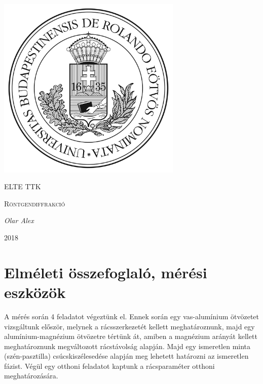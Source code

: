 \documentclass[a4paper,12pt]{article}
\begin{document}
\linespread{1.25}

\begin{titlepage}

	\centering
	\includegraphics[width=0.66\textwidth]{elte.jpg}\par\vspace{1cm}
	{\scshape\LARGE ELTE TTK \par}
	\vspace{3cm}
	{\scshape\Large Röntgendiffrakció \par}
	\vspace{1cm}
	{\large\itshape Olar Alex\par}
	\vspace{3cm}
	{\large 2018 \par}
	
\end{titlepage}

\tableofcontents

\newpage

\section{Elméleti összefoglaló, mérési eszközök}

\par A mérés során 4 feladatot végeztünk el. Ennek során egy vas-alumínium ötvözetet vizsgáltunk először, melynek a rácsszerkezetét kellett meghatároznunk, majd egy alumínium-magnézium ötvözetre tértünk át, amiben a magnézium arányát kellett meghatároznunk megváltozott rácstávolság alapján. Majd egy ismeretlen minta (szén-pasztilla) csúcskiszélesedése alapján meg lehetett határozni az ismeretlen fázist. Végül egy otthoni feladatot kaptunk a rácsparaméter otthoni meghatározására.
\end{document}
